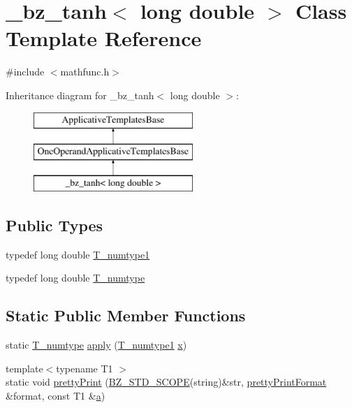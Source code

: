 \hypertarget{class__bz__tanh_3_01long_01double_01_4}{}\section{\+\_\+bz\+\_\+tanh$<$ long double $>$ Class Template Reference}
\label{class__bz__tanh_3_01long_01double_01_4}


{\ttfamily \#include $<$mathfunc.\+h$>$}

Inheritance diagram for \+\_\+bz\+\_\+tanh$<$ long double $>$\+:\begin{figure}[H]
\begin{center}
\leavevmode
\includegraphics[height=3.000000cm]{class__bz__tanh_3_01long_01double_01_4}
\end{center}
\end{figure}
\subsection*{Public Types}
\begin{DoxyCompactItemize}
\item 
typedef long double \hyperlink{class__bz__tanh_3_01long_01double_01_4_afc93e5c766f9a6faf41867faae9c0a9d}{T\+\_\+numtype1}
\item 
typedef long double \hyperlink{class__bz__tanh_3_01long_01double_01_4_aec0ce926b7ad93a1289e347df2385081}{T\+\_\+numtype}
\end{DoxyCompactItemize}
\subsection*{Static Public Member Functions}
\begin{DoxyCompactItemize}
\item 
static \hyperlink{class__bz__tanh_3_01long_01double_01_4_aec0ce926b7ad93a1289e347df2385081}{T\+\_\+numtype} \hyperlink{class__bz__tanh_3_01long_01double_01_4_a22d2d2086560ead8768c4449f053f505}{apply} (\hyperlink{class__bz__tanh_3_01long_01double_01_4_afc93e5c766f9a6faf41867faae9c0a9d}{T\+\_\+numtype1} \hyperlink{vecnorm1_8cc_ac73eed9e41ec09d58f112f06c2d6cb63}{x})
\item 
{\footnotesize template$<$typename T1 $>$ }\\static void \hyperlink{class__bz__tanh_3_01long_01double_01_4_a438d1749f54a7e5afed938b8899f1516}{pretty\+Print} (\hyperlink{numinquire_8h_a2b24ffc3b4ef9803956bc7715c6c7b83}{B\+Z\+\_\+\+S\+T\+D\+\_\+\+S\+C\+O\+P\+E}(string)\&str, \hyperlink{classprettyPrintFormat}{pretty\+Print\+Format} \&format, const T1 \&\hyperlink{gen__mat5files_8m_aae328bf20413f220e38aec4d95bfd6da}{a})
\end{DoxyCompactItemize}


